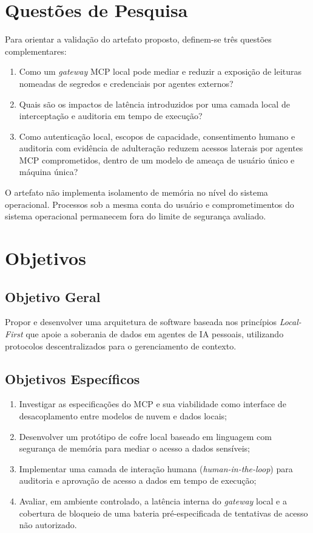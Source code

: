 \documentclass[12pt,openright,twoside,a4paper,english,brazil]{abntex2}
\begin{document}
\section{Questões de Pesquisa}
Para orientar a validação do artefato proposto, definem-se três questões complementares:
\begin{enumerate}
\item Como um \textit{gateway} MCP local pode mediar e reduzir a exposição de leituras nomeadas de segredos e credenciais por agentes externos?
\item Quais são os impactos de latência introduzidos por uma camada local de interceptação e auditoria em tempo de execução?
\item Como autenticação local, escopos de capacidade, consentimento humano e auditoria com evidência de adulteração reduzem acessos laterais por agentes MCP comprometidos, dentro de um modelo de ameaça de usuário único e máquina única?
\end{enumerate}
O artefato não implementa isolamento de memória no nível do sistema operacional. Processos sob a mesma conta do usuário e comprometimentos do sistema operacional permanecem fora do limite de segurança avaliado.

\section{Objetivos}
\subsection{Objetivo Geral}
Propor e desenvolver uma arquitetura de software baseada nos princípios \textit{Local-First} que apoie a soberania de dados em agentes de IA pessoais, utilizando protocolos descentralizados para o gerenciamento de contexto.

\subsection{Objetivos Específicos}
\begin{enumerate}
\item Investigar as especificações do MCP e sua viabilidade como interface de desacoplamento entre modelos de nuvem e dados locais;
\item Desenvolver um protótipo de cofre local baseado em linguagem com segurança de memória para mediar o acesso a dados sensíveis;
\item Implementar uma camada de interação humana (\textit{human-in-the-loop}) para auditoria e aprovação de acesso a dados em tempo de execução;
\item Avaliar, em ambiente controlado, a latência interna do \textit{gateway} local e a cobertura de bloqueio de uma bateria pré-especificada de tentativas de acesso não autorizado.
\end{enumerate}
\end{document}
